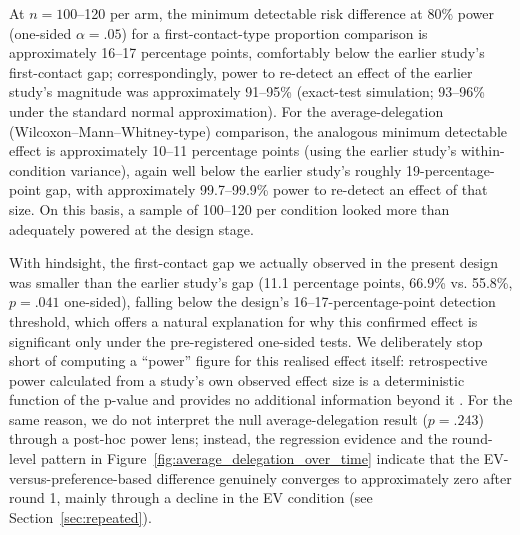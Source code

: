 \documentclass[a4paper, 12pt, fleqn]{article}
\theoremstyle{hypstyle}
\begin{document}
At $n = 100$--120 per arm, the minimum detectable risk difference at 80\% power (one-sided $\alpha = .05$) for a first-contact-type proportion comparison is approximately 16--17 percentage points, comfortably below the earlier study's first-contact gap; correspondingly, power to re-detect an effect of the earlier study's magnitude was approximately 91--95\% (exact-test simulation; 93--96\% under the standard normal approximation). For the average-delegation (Wilcoxon--Mann--Whitney-type) comparison, the analogous minimum detectable effect is approximately 10--11 percentage points (using the earlier study's within-condition variance), again well below the earlier study's roughly 19-percentage-point gap, with approximately 99.7--99.9\% power to re-detect an effect of that size. On this basis, a sample of 100--120 per condition looked more than adequately powered at the design stage. 

With hindsight, the first-contact gap we actually observed in the present design was smaller than the earlier study's gap (11.1 percentage points, 66.9\% vs. 55.8\%, $p = .041$ one-sided), falling below the design's 16--17-percentage-point detection threshold, which offers a natural explanation for why this confirmed effect is significant only under the pre-registered one-sided tests. We deliberately stop short of computing a ``power'' figure for this realised effect itself: retrospective power calculated from a study's own observed effect size is a deterministic function of the p-value and provides no additional information beyond it \citep{HoenigHeisey2001}. For the same reason, we do not interpret the null average-delegation result ($p = .243$) through a post-hoc power lens; instead, the regression evidence and the round-level pattern in Figure~\ref{fig:average_delegation_over_time} indicate that the EV-versus-preference-based difference genuinely converges to approximately zero after round 1, mainly through a decline in the EV condition (see Section~\ref{sec:repeated}).
\end{document}
